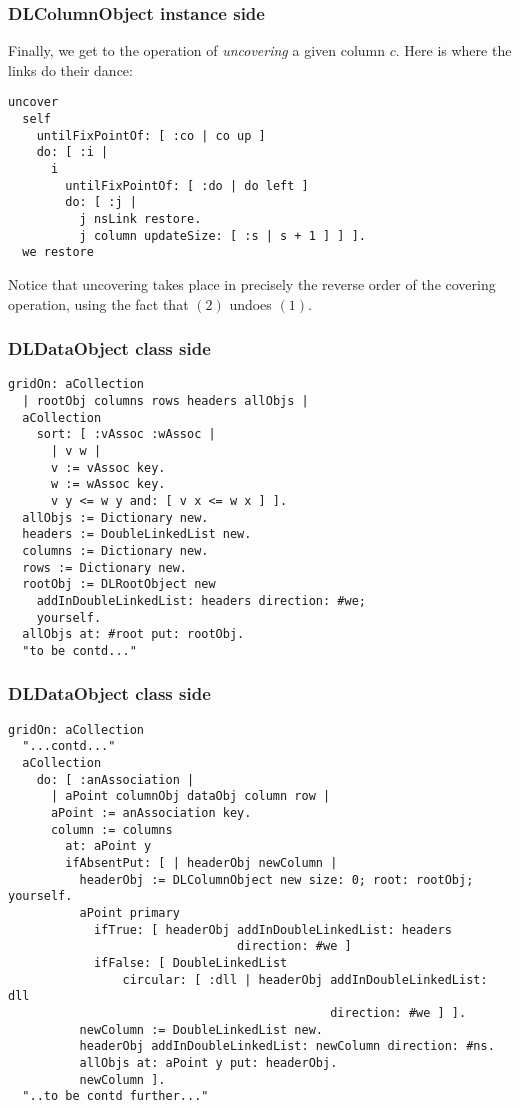 \documentclass{beamer}
\begin{document}
\begin{frame}[fragile]
\frametitle{DLColumnObject instance side}
Finally, we get to the operation of \textit{uncovering} a given column $c$. 
Here is where the links do their dance:
\begin{verbatim}
uncover
  self
    untilFixPointOf: [ :co | co up ]
    do: [ :i | 
      i
        untilFixPointOf: [ :do | do left ]
        do: [ :j | 
          j nsLink restore.
          j column updateSize: [ :s | s + 1 ] ] ].
  we restore
\end{verbatim}
Notice that uncovering takes place in precisely the reverse order of the 
covering operation, using the fact that $(2)$ undoes $(1)$.
\end{frame}

\begin{frame}[fragile]
\frametitle{DLDataObject class side}
\begin{verbatim}
gridOn: aCollection
  | rootObj columns rows headers allObjs |
  aCollection
    sort: [ :vAssoc :wAssoc | 
      | v w |
      v := vAssoc key.
      w := wAssoc key.
      v y <= w y and: [ v x <= w x ] ].
  allObjs := Dictionary new.
  headers := DoubleLinkedList new.
  columns := Dictionary new.
  rows := Dictionary new.
  rootObj := DLRootObject new
    addInDoubleLinkedList: headers direction: #we;
    yourself.
  allObjs at: #root put: rootObj.
  "to be contd..."
\end{verbatim}
\end{frame}

\begin{frame}[fragile]
\frametitle{DLDataObject class side}
\begin{verbatim}
gridOn: aCollection
  "...contd..."
  aCollection
    do: [ :anAssociation | 
      | aPoint columnObj dataObj column row |
      aPoint := anAssociation key.
      column := columns
        at: aPoint y
        ifAbsentPut: [ | headerObj newColumn |
          headerObj := DLColumnObject new size: 0; root: rootObj; yourself.
          aPoint primary
            ifTrue: [ headerObj addInDoubleLinkedList: headers 
                                direction: #we ]
            ifFalse: [ DoubleLinkedList
                circular: [ :dll | headerObj addInDoubleLinkedList: dll 
                                             direction: #we ] ].
          newColumn := DoubleLinkedList new.
          headerObj addInDoubleLinkedList: newColumn direction: #ns.
          allObjs at: aPoint y put: headerObj.
          newColumn ].
  "..to be contd further..."
\end{verbatim}
\end{frame}
\end{document}

